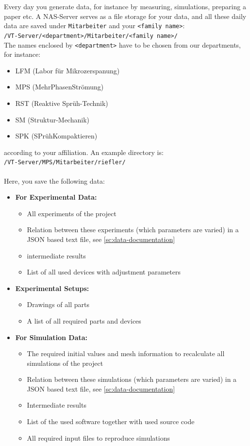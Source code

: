 Every day you generate data, for instance by measuring, simulations, preparing a
paper etc. A NAS-Server serves as a file storage for your data, and all these
daily data are saved under \texttt{Mitarbeiter} and your
\texttt{<family name>}: \\
\texttt{/VT-Server/<department>/Mitarbeiter/<family name>/} \\
The names enclosed by \texttt{<department>} have to be chosen from our
departments, for instance:
\begin{itemize}
  \item LFM (Labor für Mikrozerspanung)
  \item MPS (MehrPhasenStrömung)
  \item RST (Reaktive Sprüh-Technik)
  \item SM (Struktur-Mechanik)
  \item SPK (SPrühKompaktieren)
\end{itemize}
according to your affiliation. An example directory is: \\
\texttt{/VT-Server/MPS/Mitarbeiter/riefler/} \\
\\
Here, you save the following data:
\begin{itemize}
  \item[$\rightarrow$] \textbf{For Experimental Data:}
    \begin{itemize}
      \item All experiments of the project
      \item Relation between these experiments (which parameters are varied) in
            a JSON based text file, see \autoref{sc:data-documentation}
      \item intermediate results
      \item List of all used devices with adjustment parameters
    \end{itemize}
  \item[$\rightarrow$] \textbf{Experimental Setups:}
    \begin{itemize}
      \item Drawings of all parts
      \item A list of all required parts and devices
    \end{itemize}
  \item[$\rightarrow$] \textbf{For Simulation Data:}
    \begin{itemize}
      \item The required initial values and mesh information to recalculate all
            simulations of the project
      \item Relation between these simulations (which parameters are varied) in
            a JSON based text file, see \autoref{sc:data-documentation}
      \item Intermediate results
      \item List of the used software together with used source code
      \item All required input files to reproduce simulations
    \end{itemize}
\end{itemize}

